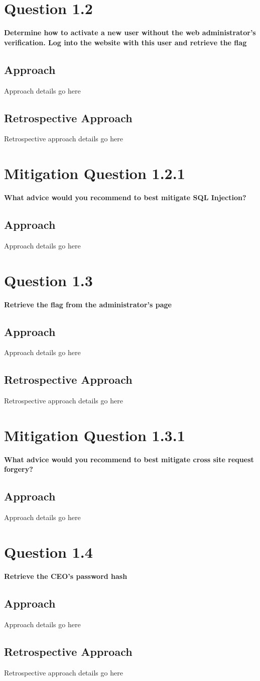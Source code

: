 \section{Question 1.2}
\textbf{Determine how to activate a new user without the web administrator's
verification. Log into the website with this user and retrieve the flag}
\subsection{Approach}
Approach details go here
\subsection{Retrospective Approach}
Retrospective approach details go here

\section{Mitigation Question 1.2.1}
\textbf{What advice would you recommend to best mitigate SQL Injection?}
\subsection{Approach}
Approach details go here

\section{Question 1.3}
\textbf{Retrieve the flag from the administrator's page}
\subsection{Approach}
Approach details go here
\subsection{Retrospective Approach}
Retrospective approach details go here

\section{Mitigation Question 1.3.1}
\textbf{What advice would you recommend to best mitigate cross site request
forgery?}
\subsection{Approach}
Approach details go here

\section{Question 1.4}
\textbf{Retrieve the CEO's password hash}
\subsection{Approach}
Approach details go here
\subsection{Retrospective Approach}
Retrospective approach details go here
